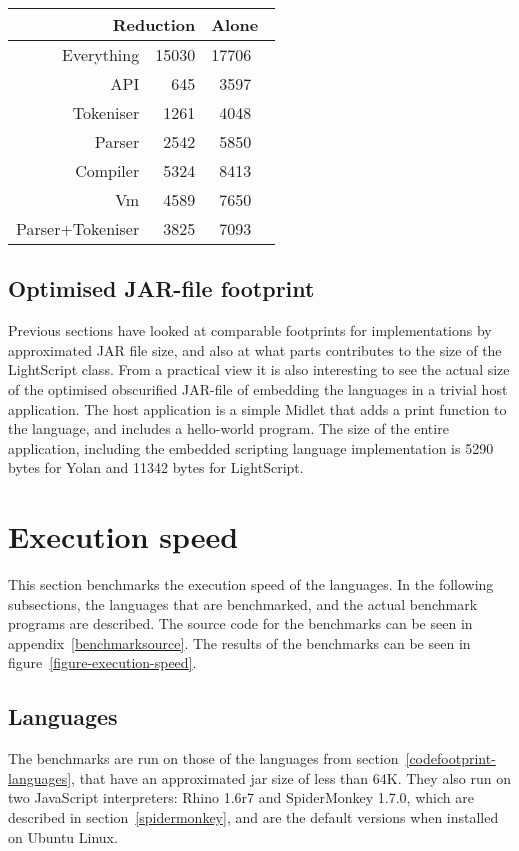 \documentclass[11pt]{report}
\begin{document}
\begin{center} \begin{tabular}{|r|r|rl|} \hline
\multicolumn{2}{|r|}{Reduction} & \multicolumn{2}{|l|}{Alone}\\ \hline
Everything & 15030 & 17706 & \\ \hline
API & 645  & 3597  & \\ \hline
Tokeniser & 1261 & 4048 & \\ \hline
Parser & 2542 & 5850 & \\ \hline
Compiler & 5324 & 8413 & \\ \hline
Vm & 4589 & 7650 & \\ \hline
Parser+Tokeniser & 3825 & 7093 & \\ \hline
\end{tabular} \end{center}

\subsection{Optimised JAR-file footprint}
Previous sections have looked at comparable footprints for implementations by approximated JAR file size, and also at what parts contributes to the size of the LightScript class.
From a practical view it is also interesting to see the actual size of the optimised obscurified JAR-file of embedding the languages in a trivial host application.
The host application is a simple Midlet that adds a print function to the language, and includes a hello-world program.
The size of the entire application, including the embedded scripting language implementation is 5290 bytes for Yolan and 11342 bytes for LightScript. 

\section{Execution speed}
This section benchmarks the execution speed of the languages. 
In the following subsections, the languages that are benchmarked, and the actual benchmark programs are described.
The source code for the benchmarks can be seen in appendix~\ref{benchmarksource}.
The results of the benchmarks can be seen in figure~\ref{figure-execution-speed}.

\subsection{Languages}
The benchmarks are run on those of the languages from section~\ref{codefootprint-languages}, that have an approximated jar size of less than 64K. They also run on two JavaScript interpreters: Rhino 1.6r7 and SpiderMonkey 1.7.0, which are described in section~\ref{spidermonkey}, and are the default versions when installed on Ubuntu Linux.
\end{document}

